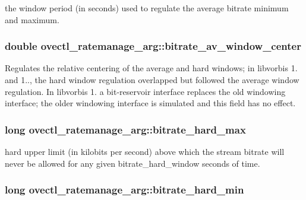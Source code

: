 the window period (in seconds) used to regulate the average bitrate minimum and maximum. \hypertarget{structovectl__ratemanage__arg_aad317d50fb4d072e2c55f0a60d1a83b2}{
\subsubsection[{bitrate\+\_\+av\+\_\+window\+\_\+center}]{\setlength{\rightskip}{0pt plus 5cm}double ovectl\+\_\+ratemanage\+\_\+arg\+::bitrate\+\_\+av\+\_\+window\+\_\+center}}\label{structovectl__ratemanage__arg_aad317d50fb4d072e2c55f0a60d1a83b2}
Regulates the relative centering of the average and hard windows; in libvorbis 1. and 1.., the hard window regulation overlapped but followed the average window regulation. In libvorbis 1. a bit-\/reservoir interface replaces the old windowing interface; the older windowing interface is simulated and this field has no effect. \hypertarget{structovectl__ratemanage__arg_a3620024b5a9e4b4df6d20deb6c125c92}{
\subsubsection[{bitrate\+\_\+hard\+\_\+max}]{\setlength{\rightskip}{0pt plus 5cm}long ovectl\+\_\+ratemanage\+\_\+arg\+::bitrate\+\_\+hard\+\_\+max}}\label{structovectl__ratemanage__arg_a3620024b5a9e4b4df6d20deb6c125c92}
hard upper limit (in kilobits per second) above which the stream bitrate will never be allowed for any given bitrate\+\_\+hard\+\_\+window seconds of time. \hypertarget{structovectl__ratemanage__arg_a449d3ea8d0645742af859dd17b41fbfb}{
\subsubsection[{bitrate\+\_\+hard\+\_\+min}]{\setlength{\rightskip}{0pt plus 5cm}long ovectl\+\_\+ratemanage\+\_\+arg\+::bitrate\+\_\+hard\+\_\+min}}\label{structovectl__ratemanage__arg_a449d3ea8d0645742af859dd17b41fbfb}
